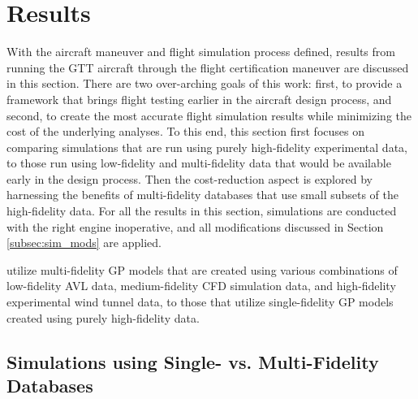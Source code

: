 \section{Results} \label{sec:cba_results}
With the aircraft maneuver and flight simulation process defined, results from running the GTT aircraft through the flight certification maneuver are discussed in this section.
There are two over-arching goals of this work: first, to provide a framework that brings flight testing earlier in the aircraft design process, and second, to create the most accurate flight simulation results while minimizing the cost of the underlying analyses. 
To this end, this section first focuses on comparing simulations that are run using purely high-fidelity experimental data, to those run using low-fidelity and multi-fidelity data that would be available early in the design process.
Then the cost-reduction aspect is explored by harnessing the benefits of multi-fidelity databases that use small subsets of the high-fidelity data. 
For all the results in this section, simulations are conducted with the right engine inoperative, and all modifications discussed in Section \ref{subsec:sim_mods} are applied.

utilize multi-fidelity GP models that are created using various combinations of low-fidelity AVL data, medium-fidelity CFD simulation data, and high-fidelity experimental wind tunnel data, to those that utilize single-fidelity GP models created using purely high-fidelity data. 

\subsection{Simulations using Single- vs. Multi-Fidelity Databases} \label{subsec:sf_vs_mf_cba}

